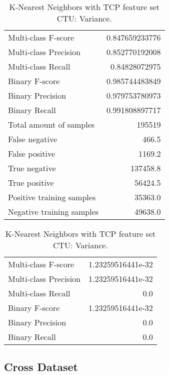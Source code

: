 \begin{table}[H]
\begin{minipage}{0.5\textwidth}
\caption{K-Nearest Neighbors with TCP feature set CTU: Average.}
\centering
\begin{tabular}{l r}
\toprule
Multi-class F-score & 0.847659233776 \\
Multi-class Precision & 0.852770192008 \\
Multi-class Recall & 0.84828072975 \\
\midrule
Binary F-score & 0.985744483849 \\
Binary Precision & 0.979753780973 \\
Binary Recall & 0.991808897717 \\
\midrule
Total amount of samples & 195519 \\
False negative & 466.5 \\
False positive & 1169.2 \\
True negative & 137458.8 \\
True positive & 56424.5 \\
\midrule
Positive training samples & 35363.0 \\
Negative training samples & 49638.0 \\
\bottomrule
\end{tabular}
\end{minipage}
\hfillx
\begin{minipage}{0.5\textwidth}
\caption{K-Nearest Neighbors with TCP feature set CTU: Variance.}
\centering
\begin{tabular}{l r}
\toprule
Multi-class F-score & 1.23259516441e-32 \\
Multi-class Precision & 1.23259516441e-32 \\
Multi-class Recall & 0.0 \\
\midrule
Binary F-score & 1.23259516441e-32 \\
Binary Precision & 0.0 \\
Binary Recall & 0.0 \\
\bottomrule
\end{tabular}
\end{minipage}
\end{table}

\newpage
\subsection{Cross Dataset}

